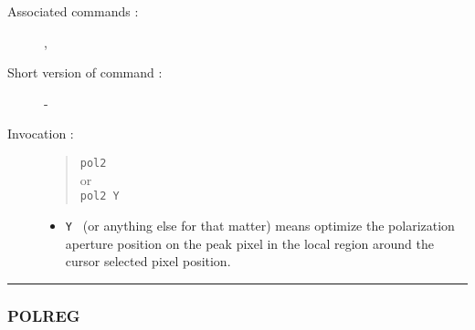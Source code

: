 \begin{description}
\item[Associated commands :] {\tt {}}, 
{\tt {}}
\item[Short version of command :] -
\item[Invocation :]

\begin{quote}{\tt  pol2 }\\
or \\
{\tt pol2 Y }
\end{quote}

\begin{itemize}

\item {\tt Y } (or anything else for that matter) means optimize the
 polarization aperture position on the peak pixel in the
 local region around the cursor selected pixel position.
\end{itemize}

\end{description}

\hrule 
\subsubsection*{\label{POLREG}POLREG}

